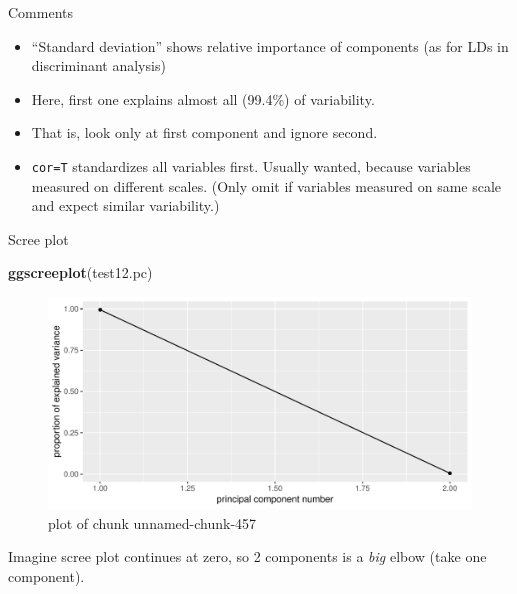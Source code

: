 \documentclass[ignorenonframetext,]{beamer}
\newenvironment{Shaded}{\begin{snugshade}}{\end{snugshade}}
\newcommand{\KeywordTok}[1]{\textcolor[rgb]{0.13,0.29,0.53}{\textbf{#1}}}
\newcommand{\NormalTok}[1]{#1}
\begin{document}
\begin{frame}[fragile]{Comments}
\protect\hypertarget{comments-26}{}

\begin{itemize}
\item
  ``Standard deviation'' shows relative importance of components (as for
  LDs in discriminant analysis)
\item
  Here, first one explains almost all (99.4\%) of variability.
\item
  That is, look only at first component and ignore second.
\item
  \texttt{cor=T} standardizes all variables first. Usually wanted,
  because variables measured on different scales. (Only omit if
  variables measured on same scale and expect similar variability.)
\end{itemize}

\end{frame}

\begin{frame}[fragile]{Scree plot}
\protect\hypertarget{scree-plot-1}{}

\begin{Shaded}
\begin{Highlighting}[]
\KeywordTok{ggscreeplot}\NormalTok{(test12.pc)}
\end{Highlighting}
\end{Shaded}

\begin{figure}
\centering
\includegraphics{figure/unnamed-chunk-457-1.pdf}
\caption{plot of chunk unnamed-chunk-457}
\end{figure}

Imagine scree plot continues at zero, so 2 components is a \emph{big}
elbow (take one component).

\end{frame}
\end{document}
